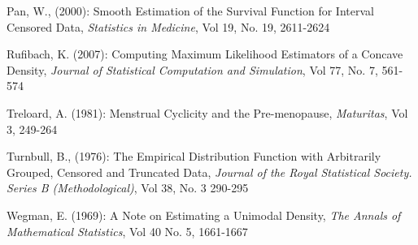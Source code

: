\documentclass[10pt]{article}
\begin{document}
\vspace{3mm}

Pan, W., (2000): Smooth Estimation of the Survival Function for Interval Censored Data, \emph{Statistics in Medicine}, Vol 19, No. 19, 2611-2624

\vspace{3mm}

Rufibach, K. (2007): Computing Maximum Likelihood Estimators of a Concave Density, \emph{Journal of Statistical Computation and Simulation}, Vol 77, No. 7, 561-574

\vspace{3mm}

Treloard, A. (1981): Menstrual Cyclicity and the Pre-menopause, \emph{Maturitas}, Vol 3, 249-264

\vspace{3mm}

Turnbull, B., (1976): The Empirical Distribution Function with Arbitrarily Grouped, Censored and Truncated Data, \emph{Journal of the Royal Statistical Society. Series B (Methodological)}, Vol 38, No. 3 290-295

\vspace{3mm}

Wegman, E. (1969): A Note on Estimating a Unimodal Density, \emph{The Annals of Mathematical Statistics}, Vol 40 No. 5, 1661-1667

\vspace{3mm}


	
	 
\end{document}
